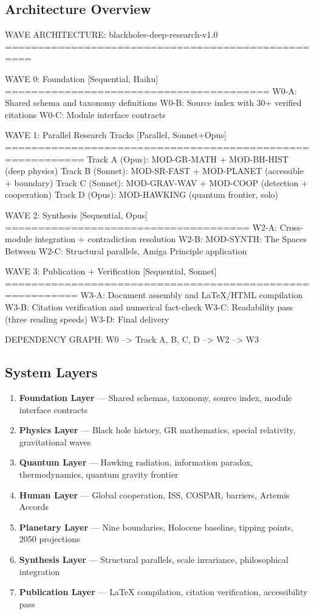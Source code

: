 \documentclass[11pt,letterpaper]{article}
\begin{document}
\subsection{Architecture Overview}

\begin{asciibox}
WAVE ARCHITECTURE: blackholes-deep-research-v1.0
==================================================

  WAVE 0: Foundation [Sequential, Haiku]
  ========================================
  W0-A: Shared schema and taxonomy definitions
  W0-B: Source index with 30+ verified citations
  W0-C: Module interface contracts

  WAVE 1: Parallel Research Tracks [Parallel, Sonnet+Opus]
  ==========================================================
  Track A (Opus):     MOD-GR-MATH + MOD-BH-HIST (deep physics)
  Track B (Sonnet):   MOD-SR-FAST + MOD-PLANET   (accessible + boundary)
  Track C (Sonnet):   MOD-GRAV-WAV + MOD-COOP    (detection + cooperation)
  Track D (Opus):     MOD-HAWKING                 (quantum frontier, solo)

  WAVE 2: Synthesis [Sequential, Opus]
  =====================================
  W2-A: Cross-module integration + contradiction resolution
  W2-B: MOD-SYNTH: The Spaces Between
  W2-C: Structural parallels, Amiga Principle application

  WAVE 3: Publication + Verification [Sequential, Sonnet]
  =========================================================
  W3-A: Document assembly and LaTeX/HTML compilation
  W3-B: Citation verification and numerical fact-check
  W3-C: Readability pass (three reading speeds)
  W3-D: Final delivery

  DEPENDENCY GRAPH:
  W0 --> {Track A, B, C, D} --> W2 --> W3
\end{asciibox}

\subsection{System Layers}

\begin{enumerate}[leftmargin=*]
\item \textbf{Foundation Layer} --- Shared schemas, taxonomy, source index, module interface contracts
\item \textbf{Physics Layer} --- Black hole history, GR mathematics, special relativity, gravitational waves
\item \textbf{Quantum Layer} --- Hawking radiation, information paradox, thermodynamics, quantum gravity frontier
\item \textbf{Human Layer} --- Global cooperation, ISS, COSPAR, barriers, Artemis Accords
\item \textbf{Planetary Layer} --- Nine boundaries, Holocene baseline, tipping points, 2050 projections
\item \textbf{Synthesis Layer} --- Structural parallels, scale invariance, philosophical integration
\item \textbf{Publication Layer} --- LaTeX compilation, citation verification, accessibility pass
\end{enumerate}
\end{document}
